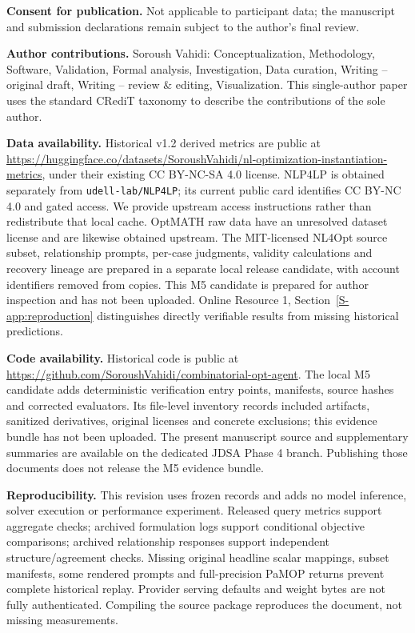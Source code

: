 \documentclass[pdflatex,iicol,sn-basic,Numbered]{sn-jnl}
\begin{document}
\noindent\textbf{Consent for publication.} Not applicable to participant data; the manuscript and submission declarations remain subject to the author's final review.

\noindent\textbf{Author contributions.} Soroush Vahidi: Conceptualization, Methodology, Software, Validation, Formal analysis, Investigation, Data curation, Writing -- original draft, Writing -- review \& editing, Visualization. This single-author paper uses the standard CRediT taxonomy to describe the contributions of the sole author.

\noindent\textbf{Data availability.} Historical v1.2 derived metrics are public at \url{https://huggingface.co/datasets/SoroushVahidi/nl-optimization-instantiation-metrics}, under their existing CC BY-NC-SA 4.0 license. NLP4LP is obtained separately from \texttt{udell-lab/NLP4LP}; its current public card identifies CC BY-NC 4.0 and gated access. We provide upstream access instructions rather than redistribute that local cache. OptMATH raw data have an unresolved dataset license and are likewise obtained upstream. The MIT-licensed NL4Opt source subset, relationship prompts, per-case judgments, validity calculations and recovery lineage are prepared in a separate local release candidate, with account identifiers removed from copies. This M5 candidate is prepared for author inspection and has not been uploaded. Online Resource 1, Section~\ref{S-app:reproduction} distinguishes directly verifiable results from missing historical predictions.

\noindent\textbf{Code availability.} Historical code is public at \url{https://github.com/SoroushVahidi/combinatorial-opt-agent}. The local M5 candidate adds deterministic verification entry points, manifests, source hashes and corrected evaluators. Its file-level inventory records included artifacts, sanitized derivatives, original licenses and concrete exclusions; this evidence bundle has not been uploaded. The present manuscript source and supplementary summaries are available on the dedicated JDSA Phase 4 branch. Publishing those documents does not release the M5 evidence bundle.

\noindent\textbf{Reproducibility.} This revision uses frozen records and adds no model inference, solver execution or performance experiment. Released query metrics support aggregate checks; archived formulation logs support conditional objective comparisons; archived relationship responses support independent structure/agreement checks. Missing original headline scalar mappings, subset manifests, some rendered prompts and full-precision PaMOP returns prevent complete historical replay. Provider serving defaults and weight bytes are not fully authenticated. Compiling the source package reproduces the document, not missing measurements.
\end{document}
